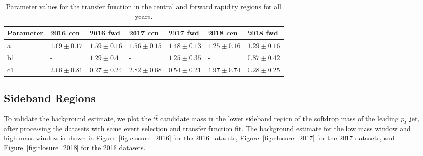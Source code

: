 \begin{table}[!htbp]
    \centering
    \small
    \begin{tabular}{| p{1.8cm} | p{1.8cm} | p{1.8cm} | p{1.8cm} | p{1.8cm} | p{1.8cm} | p{1.8cm} | }
        \hline
        \textbf{Parameter} & \textbf{2016 cen}  & \textbf{2016 fwd} & \textbf{2017 cen}  & \textbf{2017 fwd} & \textbf{2018 cen}  & \textbf{2018 fwd}  \\
        \hline
        a & $1.69 \pm 0.17$  & $1.59 \pm 0.16$  & $1.56 \pm 0.15$  & $1.48 \pm 0.13$  & $1.25 \pm 0.16$  & $1.29 \pm 0.16$ \\
        b1 & -   & $1.29 \pm 0.4$  & -   & $1.25 \pm 0.35$  & -   & $0.87 \pm 0.42$ \\
        c1 & $2.66 \pm 0.81$  & $0.27 \pm 0.24$  & $2.82 \pm 0.68$  & $0.54 \pm 0.21$  & $1.97 \pm 0.74$  & $0.28 \pm 0.25$ \\
        \hline
    \end{tabular}
    \caption{Parameter values for the transfer function in the central and forward rapidity regions for all years.}
    \label{tab:transfer_all}
\end{table}



%
%
%

\subsection{Sideband Regions}

To validate the background estimate, we plot the $t\bar{t}$ candidate mass in the lower sideband region of the softdrop mass of the leading $p_T$ jet, after processing the datasets with same event selection and transfer function fit. The background estimate for the low mass window and high mass window is shown in Figure~\ref{fig:closure_2016} for the 2016 datasets, Figure~\ref{fig:closure_2017} for the 2017 datasets, and Figure~\ref{fig:closure_2018} for the 2018 datasets. 




